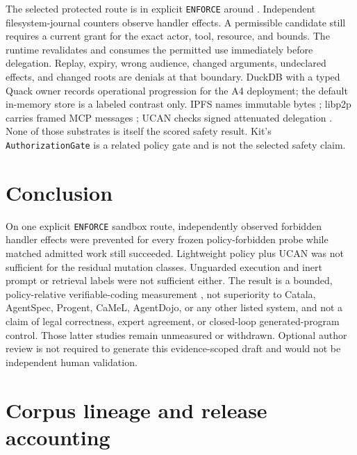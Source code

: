 \documentclass{article}
\begin{document}
The selected protected route is  in explicit \texttt{ENFORCE} around . Independent filesystem-journal counters observe handler effects. A permissible candidate still requires a current grant for the exact actor, tool, resource, and bounds. The runtime revalidates and consumes the permitted use immediately before delegation. Replay, expiry, wrong audience, changed arguments, undeclared effects, and changed roots are denials at that boundary. DuckDB with a typed Quack owner records operational progression for the A4 deployment; the default in-memory store is a labeled contrast only. IPFS names immutable bytes \citep{ipfs}; libp2p carries framed MCP messages \citep{libp2p}; UCAN checks signed attenuated delegation \citep{ucan}. None of those substrates is itself the scored safety result. Kit's \texttt{AuthorizationGate} is a related policy gate and is not the selected safety claim.




\section{Conclusion}

On one explicit \texttt{ENFORCE} sandbox route, independently observed forbidden handler effects were prevented for every frozen policy-forbidden probe while matched admitted work still succeeded. Lightweight policy plus UCAN was not sufficient for the residual mutation classes. Unguarded execution and inert prompt or retrieval labels were not sufficient either. The result is a bounded, policy-relative verifiable-coding measurement \citep{vericode2026cfp}, not superiority to Catala, AgentSpec, Progent, CaMeL, AgentDojo, or any other listed system, and not a claim of legal correctness, expert agreement, or closed-loop generated-program control. Those latter studies remain unmeasured or withdrawn. Optional author review is not required to generate this evidence-scoped draft and would not be independent human validation.

\clearpage


\clearpage
\appendix

\section{Corpus lineage and release accounting}
\end{document}
